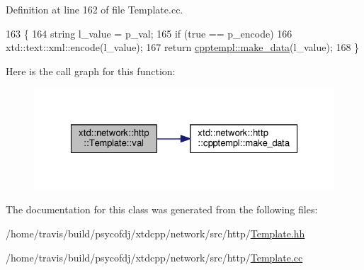 Definition at line 162 of file Template.\-cc.


\begin{DoxyCode}
163 \{
164   \textcolor{keywordtype}{string} l\_value = p\_val;
165   \textcolor{keywordflow}{if} (\textcolor{keyword}{true} == p\_encode)
166     xtd::text::xml::encode(l\_value);
167   \textcolor{keywordflow}{return} \hyperlink{namespacextd_1_1network_1_1http_1_1cpptempl_a32fe5ec0914372b09492647a168dbbcb}{cpptempl::make\_data}(l\_value);
168 \}
\end{DoxyCode}


Here is the call graph for this function\-:
\nopagebreak
\begin{figure}[H]
\begin{center}
\leavevmode
\includegraphics[width=326pt]{classxtd_1_1network_1_1http_1_1Template_a3a96743542ae1a063e90ec3ec2e774f8_cgraph}
\end{center}
\end{figure}




The documentation for this class was generated from the following files\-:\begin{DoxyCompactItemize}
\item 
/home/travis/build/psycofdj/xtdcpp/network/src/http/\hyperlink{Template_8hh}{Template.\-hh}\item 
/home/travis/build/psycofdj/xtdcpp/network/src/http/\hyperlink{Template_8cc}{Template.\-cc}\end{DoxyCompactItemize}
